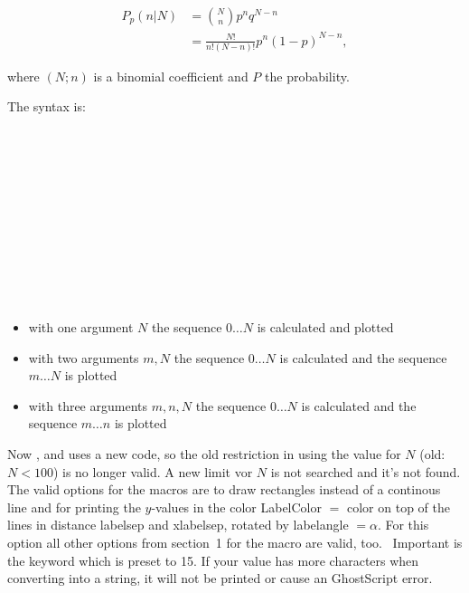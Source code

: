 \documentclass[fontsize=11pt,english,BCOR=10mm,DIV=12,bibliography=totoc,parskip=false,headings=small,
    headinclude=false,footinclude=false,oneside]{pst-doc}
\begin{document}
\begin{align}
P_p(n|N) &= \binom{N}{n}p^nq^{N-n} \\
         &= \frac{N!}{n!(N-n)!}p^n(1-p)^{N-n},
\end{align}

where $(N; n)$ is a binomial coefficient and $P$ the probability.

The syntax is:

\begin{BDef}
\OptArgs{}\\
\OptArgs{}\\
\OptArgs{}\\
\OptArgs{}\\
\OptArgs{}\\
\OptArgs{}\\
\OptArgs{}\\
\OptArgs{}\\
\OptArgs{}\\
\OptArgs{}\\
\OptArgs{}
\end{BDef}

\begin{itemize}
\item with one argument $N$ the sequence $0\ldots N$ is calculated and plotted
\item with two arguments $m,N$ the sequence $0\ldots N$ is calculated and
    the sequence $m\ldots N$ is plotted
\item with three arguments $m,n,N$ the sequence $0\ldots N$ is calculated and
    the sequence $m\ldots n$ is plotted
\end{itemize}

Now ,  and  uses a new code, so the old restriction in using the value for $N$ (old: $N<100$) is no longer valid. A new limit vor $N$ is not searched and it's not found.
The valid options for the macros are  to draw rectangles instead
of a continous line and  for printing the $y$-values in the color LabelColor $=$ color on top of the lines in distance labelsep and xlabelsep, rotated by labelangle $=\alpha$. For this option all other options from section~1
for the macro  are valid, too.~ \cite{pst-tools}  Important is the keyword 
which is preset to 15. If your value has more characters when converting into a string, it will
not be printed or cause an GhostScript error.
\end{document}
